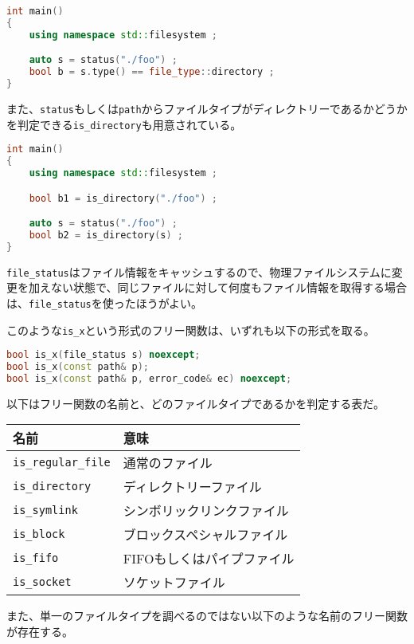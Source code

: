 \begin{lstlisting}[language=C++]
int main()
{
    using namespace std::filesystem ;

    auto s = status("./foo") ;
    bool b = s.type() == file_type::directory ;
}
\end{lstlisting}

また、\lstinline!status!もしくは\lstinline!path!からファイルタイプがディレクトリーであるかどうかを判定できる\lstinline!is_directory!も用意されている。

\begin{lstlisting}[language=C++]
int main()
{
    using namespace std::filesystem ;

    bool b1 = is_directory("./foo") ;

    auto s = status("./foo") ;
    bool b2 = is_directory(s) ;
}
\end{lstlisting}

\lstinline!file_status!はファイル情報をキャッシュするので、物理ファイルシステムに変更を加えない状態で、同じファイルに対して何度もファイル情報を取得する場合は、\lstinline!file_status!を使ったほうがよい。

このような\lstinline!is_x!という形式のフリー関数は、いずれも以下の形式を取る。

\begin{lstlisting}[language=C++]
bool is_x(file_status s) noexcept;
bool is_x(const path& p);
bool is_x(const path& p, error_code& ec) noexcept;
\end{lstlisting}

以下はフリー関数の名前と、どのファイルタイプであるかを判定する表だ。

\small
\begin{longtable}[l]{@{\ \ }p{}p{}@{\ \ }}
\toprule
名前 & 意味\tabularnewline
\midrule
\endhead
\lstinline!is_regular_file! & 通常のファイル\tabularnewline
\lstinline!is_directory! & ディレクトリーファイル\tabularnewline
\lstinline!is_symlink! & シンボリックリンクファイル\tabularnewline
\lstinline!is_block! & ブロックスペシャルファイル\tabularnewline
\lstinline!is_fifo! & FIFOもしくはパイプファイル\tabularnewline
\lstinline!is_socket! & ソケットファイル\tabularnewline
\bottomrule
\end{longtable}
\normalsize

また、単一のファイルタイプを調べるのではない以下のような名前のフリー関数が存在する。

